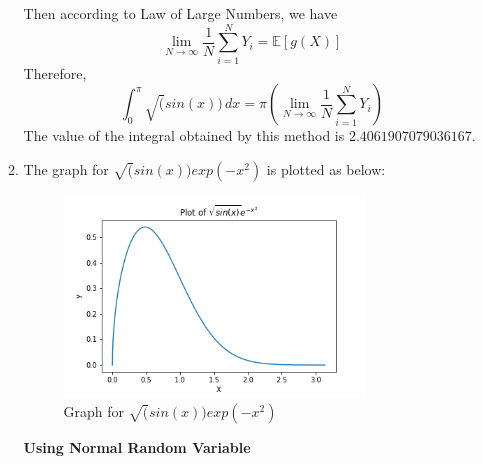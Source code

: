 \documentclass{article}
\begin{document}
\begin{enumerate}
\begin{enumerate}
                Then according to Law of Large Numbers, we have 
                \begin{equation}
                    \nonumber
                    \lim_{N\to\infty} \frac{1}{N}\sum_{i=1}^{N}Y_{i} = \mathbb{E}[g(X)]
                \end{equation}
                Therefore,
                \begin{equation}
                    \int_{0}^{\pi}\sqrt(sin(x)) \,dx =  \pi \left ( \lim_{N\to\infty} \frac{1}{N}\sum_{i=1}^{N}Y_{i} \right )
                \end{equation}
                The value of the integral obtained by this method is $2.4061907079036167$.

            \item The graph for $\sqrt(sin(x))exp(-x^{2})$ is plotted as below:
            \begin{figure}[H]
                \begin{center}
                \includegraphics[width=8cm]{Q3_2.png}
                \end{center}
                \caption{Graph for $\sqrt(sin(x))exp(-x^{2})$}
            \end{figure}

			\textbf{Using Normal Random Variable}\par
	

\end{enumerate}
\end{enumerate}
\end{document}
